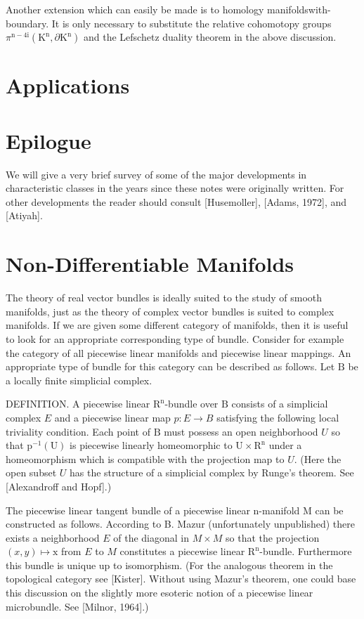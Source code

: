 \documentclass[10pt]{article}
\begin{document}
Another extension which can easily be made is to homology manifoldswith-boundary. It is only necessary to substitute the relative cohomotopy groups $\pi^{\mathrm{n}-4 \mathrm{i}}\left(\mathrm{K}^{\mathrm{n}}, \partial \mathrm{K}^{\mathrm{n}}\right)$ and the Lefschetz duality theorem in the above discussion.

\section{Applications}

\section{Epilogue}
We will give a very brief survey of some of the major developments in characteristic classes in the years since these notes were originally written. For other developments the reader should consult [Husemoller], [Adams, 1972], and [Atiyah].

\section{Non-Differentiable Manifolds}
The theory of real vector bundles is ideally suited to the study of smooth manifolds, just as the theory of complex vector bundles is suited to complex manifolds. If we are given some different category of manifolds, then it is useful to look for an appropriate corresponding type of bundle. Consider for example the category of all piecewise linear manifolds and piecewise linear mappings. An appropriate type of bundle for this category can be described as follows. Let $\mathrm{B}$ be a locally finite simplicial complex.

DEFINITION. A piecewise linear $\mathrm{R}^{\mathrm{n}}$-bundle over $\mathrm{B}$ consists of a simplicial complex $E$ and a piecewise linear map $p: E \rightarrow B$ satisfying the following local triviality condition. Each point of $\mathrm{B}$ must possess an open neighborhood $U$ so that $\mathrm{p}^{-1}(\mathrm{U})$ is piecewise linearly homeomorphic to $\mathrm{U} \times \mathrm{R}^{\mathrm{n}}$ under a homeomorphism which is compatible with the projection map to $U$. (Here the open subset $U$ has the structure of a simplicial complex by Runge's theorem. See [Alexandroff and Hopf].)

The piecewise linear tangent bundle of a piecewise linear $\mathrm{n}$-manifold M can be constructed as follows. According to B. Mazur (unfortunately unpublished) there exists a neighborhood $E$ of the diagonal in $M \times M$ so that the projection $(x, y) \mapsto \mathrm{x}$ from $E$ to $M$ constitutes a piecewise linear $\mathrm{R}^{\mathrm{n}}$-bundle. Furthermore this bundle is unique up to isomorphism. (For the analogous theorem in the topological category see [Kister]. Without using Mazur's theorem, one could base this discussion on the slightly more esoteric notion of a piecewise linear microbundle. See [Milnor, 1964].)
\end{document}
